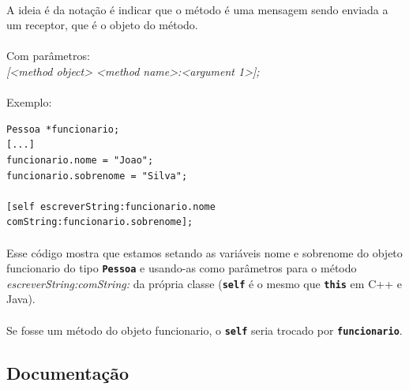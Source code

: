 \documentclass[a4paper,12pt,brazil,doubleside]{book}
\begin{document}
\paragraph{}A ideia é da notação é indicar que o método é uma mensagem sendo enviada a um receptor, que é o objeto do método.\\

\paragraph{}Com parâmetros:\\
\emph{[<method object> <method name>:<argument 1>];}\\

\paragraph{}Exemplo:

\begin{listing}
\begin{verbatim}
Pessoa *funcionario;
[...]
funcionario.nome = "Joao";
funcionario.sobrenome = "Silva";

[self escreverString:funcionario.nome comString:funcionario.sobrenome];
\end{verbatim}
\end{listing}

\bigskip

\paragraph{}Esse código mostra que estamos setando as variáveis nome e sobrenome do objeto funcionario do tipo \texttt{\textbf{Pessoa}} e usando-as como parâmetros para o método \emph{escreverString:comString:} da própria classe (\texttt{\textbf{self}} é o mesmo que \texttt{\textbf{this}} em C++ e Java).
\paragraph{}Se fosse um método do objeto funcionario, o \texttt{\textbf{self}} seria trocado por \texttt{\textbf{funcionario}}.

\bigskip

\subsection{Documentação}
\end{document}
